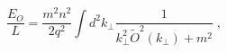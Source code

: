 \begin{equation}
\frac{E_{O}}{L}=\frac{m^{2}n^{2}}{2q^{2}}\int d^{2}k_{\bot }\frac{1}{k_{\bot
}^{2}\widetilde{O}^{2}(k_{\bot })+m^{2}}\;,  \label{ef}
\end{equation}

